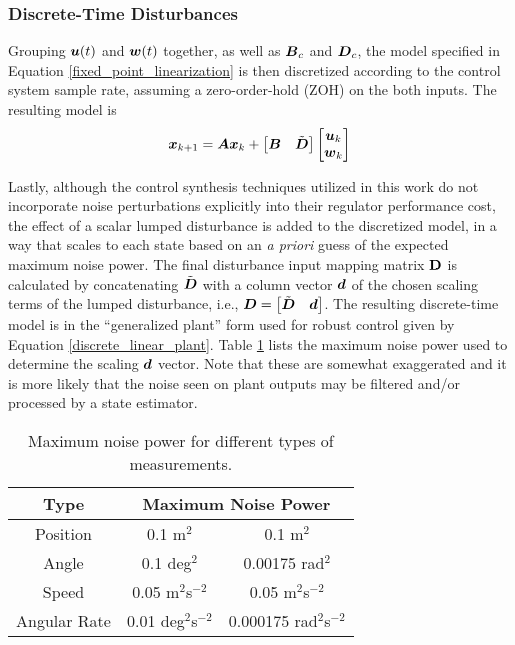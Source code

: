 \subsubsection{Discrete-Time Disturbances}
Grouping $\vb*{u}(t)$ and $\vb*{w}(t)$ together, as well as $\vb*{B}_{c}$ and $\vb*{D}_{c}$, the model specified in Equation \eqref{fixed_point_linearization} is then discretized according to the control system sample rate, assuming a zero-order-hold (ZOH) on the both inputs.  The resulting model is
\begin{equation}
\label{fixed_point_linearization_discrete}
\begin{aligned}
	\vb*{x}_{k+1} &= \vb*{A}\vb*{x}_{k} + \begin{bmatrix} \vb*{B} & \tilde{\vb*{D}} \end{bmatrix} \begin{bmatrix} \vb*{u}_{k}\\ \vb*{w}_{k} \end{bmatrix}\\
\end{aligned}
\end{equation}

Lastly, although the control synthesis techniques utilized in this work do not incorporate noise perturbations explicitly into their regulator performance cost, the effect of a scalar lumped disturbance is added to the discretized model, in a way that scales to each state based on an \emph{a priori} guess of the expected maximum noise power.  The final disturbance input mapping matrix $\vb{D}$ is calculated by concatenating $\tilde{\vb*{D}}$ with a column vector $\vb*{d}$ of the chosen scaling terms of the lumped disturbance, i.e., $\vb*{D} = \begin{bmatrix} \tilde{\vb*{D}} & \vb*{d} \end{bmatrix}$.  The resulting discrete-time model is in the ``generalized plant'' form used for robust control given by Equation \eqref{discrete_linear_plant}.  Table \ref{table:max_noise} lists the maximum noise power used to determine the scaling $\vb*{d}$ vector.  Note that these are somewhat exaggerated and it is more likely that the noise seen on plant outputs may be filtered and/or processed by a state estimator.
\begin{table}[H]
\centering
\begin{tabular}{|c||c|c|}
	\hline
	\textbf{Type} & \multicolumn{2}{c|}{\textbf{Maximum Noise Power}}\\
	\hline
	Position & 0.1 m$^{2}$ & 0.1 m$^{2}$\\
	\hline
	Angle & 0.1 deg$^{2}$ & 0.00175 rad$^{2}$\\
	\hline
	Speed & 0.05 m$^{2}$s$^{-2}$ & 0.05 m$^{2}$s$^{-2}$\\
	\hline
	Angular Rate & 0.01 deg$^{2}$s$^{-2}$ &  0.000175 rad$^{2}$s$^{-2}$\\
	\hline
\end{tabular}
\caption{Maximum noise power for different types of measurements.}
\label{table:max_noise}
\end{table}

